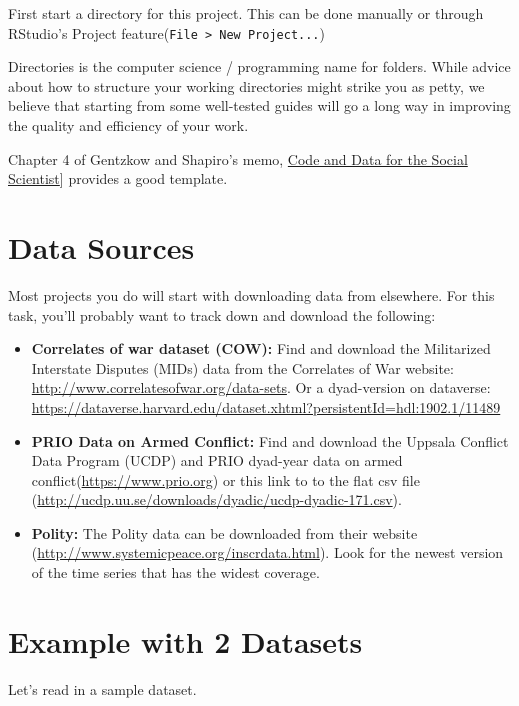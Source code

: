 \documentclass[
]{book}
\providecommand{\tightlist}{%
  \setlength{\itemsep}{0pt}\setlength{\parskip}{0pt}}
\theoremstyle{definition}
\theoremstyle{definition}
\theoremstyle{definition}
\theoremstyle{remark}
\begin{document}
First start a directory for this project. This can be done manually or through RStudio's Project feature(\texttt{File\ \textgreater{}\ New\ Project...})

Directories is the computer science / programming name for folders. While advice about how to structure your working directories might strike you as petty, we believe that starting from some well-tested guides will go a long way in improving the quality and efficiency of your work.

Chapter 4 of Gentzkow and Shapiro's memo, \href{https://web.stanford.edu/~gentzkow/research/CodeAndData.pdf}{Code and Data for the Social Scientist}{]} provides a good template.

\hypertarget{data-sources}{%
\section{Data Sources}\label{data-sources}}

Most projects you do will start with downloading data from elsewhere. For this task, you'll probably want to track down and download the following:

\begin{itemize}
\tightlist
\item
  \textbf{Correlates of war dataset (COW):} Find and download the Militarized Interstate Disputes (MIDs) data from the Correlates of War website: \url{http://www.correlatesofwar.org/data-sets}. Or a dyad-version on dataverse: \url{https://dataverse.harvard.edu/dataset.xhtml?persistentId=hdl:1902.1/11489}
\item
  \textbf{PRIO Data on Armed Conflict:} Find and download the Uppsala Conflict Data Program (UCDP) and PRIO dyad-year data on armed conflict(\url{https://www.prio.org}) or this link to to the flat csv file (\url{http://ucdp.uu.se/downloads/dyadic/ucdp-dyadic-171.csv}).
\item
  \textbf{Polity:} The Polity data can be downloaded from their website (\url{http://www.systemicpeace.org/inscrdata.html}). Look for the newest version of the time series that has the widest coverage.
\end{itemize}

\hypertarget{example-with-2-datasets}{%
\section{Example with 2 Datasets}\label{example-with-2-datasets}}

Let's read in a sample dataset.
\end{document}
